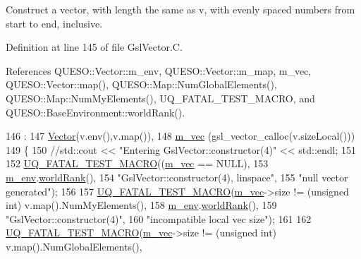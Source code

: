 Construct a vector, with length the same as {\ttfamily v}, with evenly spaced numbers from {\ttfamily start} to {\ttfamily end}, inclusive. 



Definition at line 145 of file Gsl\-Vector.\-C.



References Q\-U\-E\-S\-O\-::\-Vector\-::m\-\_\-env, Q\-U\-E\-S\-O\-::\-Vector\-::m\-\_\-map, m\-\_\-vec, Q\-U\-E\-S\-O\-::\-Vector\-::map(), Q\-U\-E\-S\-O\-::\-Map\-::\-Num\-Global\-Elements(), Q\-U\-E\-S\-O\-::\-Map\-::\-Num\-My\-Elements(), U\-Q\-\_\-\-F\-A\-T\-A\-L\-\_\-\-T\-E\-S\-T\-\_\-\-M\-A\-C\-R\-O, and Q\-U\-E\-S\-O\-::\-Base\-Environment\-::world\-Rank().


\begin{DoxyCode}
146   :
147   \hyperlink{class_q_u_e_s_o_1_1_vector_aff103391923777d30d67f3d89706278b}{Vector}(v.env(),v.map()),
148   \hyperlink{class_q_u_e_s_o_1_1_gsl_vector_a503dd126017b7ac587ff511e8d0d833b}{m\_vec}        (gsl\_vector\_calloc(v.sizeLocal()))
149 \{
150   \textcolor{comment}{//std::cout << "Entering GslVector::constructor(4)" << std::endl;}
151 
152   \hyperlink{_defines_8h_a56d63d18d0a6d45757de47fcc06f574d}{UQ\_FATAL\_TEST\_MACRO}((\hyperlink{class_q_u_e_s_o_1_1_gsl_vector_a503dd126017b7ac587ff511e8d0d833b}{m\_vec} == NULL),
153                       \hyperlink{class_q_u_e_s_o_1_1_vector_ae7615172bb1e54339151d3f3d71a0344}{m\_env}.\hyperlink{class_q_u_e_s_o_1_1_base_environment_a78b57112bbd0e6dd0e8afec00b40ffa7}{worldRank}(),
154                       \textcolor{stringliteral}{"GslVector::constructor(4), linspace"},
155                       \textcolor{stringliteral}{"null vector generated"});
156 
157   \hyperlink{_defines_8h_a56d63d18d0a6d45757de47fcc06f574d}{UQ\_FATAL\_TEST\_MACRO}(\hyperlink{class_q_u_e_s_o_1_1_gsl_vector_a503dd126017b7ac587ff511e8d0d833b}{m\_vec}->size != (\textcolor{keywordtype}{unsigned} \textcolor{keywordtype}{int}) v.map().NumMyElements(),
158                       \hyperlink{class_q_u_e_s_o_1_1_vector_ae7615172bb1e54339151d3f3d71a0344}{m\_env}.\hyperlink{class_q_u_e_s_o_1_1_base_environment_a78b57112bbd0e6dd0e8afec00b40ffa7}{worldRank}(),
159                       \textcolor{stringliteral}{"GslVector::constructor(4)"},
160                       \textcolor{stringliteral}{"incompatible local vec size"});
161 
162   \hyperlink{_defines_8h_a56d63d18d0a6d45757de47fcc06f574d}{UQ\_FATAL\_TEST\_MACRO}(\hyperlink{class_q_u_e_s_o_1_1_gsl_vector_a503dd126017b7ac587ff511e8d0d833b}{m\_vec}->size != (\textcolor{keywordtype}{unsigned} \textcolor{keywordtype}{int}) v.map().NumGlobalElements(),

\end{DoxyCode}
